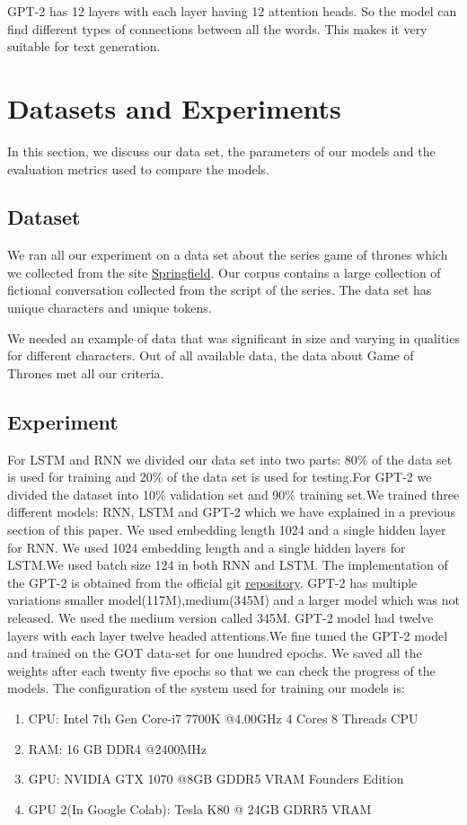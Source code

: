 \documentclass[11pt,a4paper]{article}
\begin{document}
GPT-2 has 12 layers with each layer having 12 attention heads. So the model can find different types of connections between all the words. This makes it very suitable for text generation.
\section{Datasets and Experiments}
In this section, we discuss our data set, the parameters of our models and the evaluation metrics used to compare the models.

\subsection{Dataset}
We ran all our experiment on a data set about the series game of thrones which we collected from the site  \href{https://www.springfieldspringfield.co.uk/view_episode_scripts.php?tv-show=game-of-thrones&episode=s01e01}{Springfield}. Our corpus contains a large collection of fictional conversation collected from the script of the series. The data set has  unique characters and unique tokens.

We needed an example of data that was significant in size and varying in qualities for different characters. Out of all available data, the data about Game of Thrones met all our criteria.

   
\subsection{Experiment}
For LSTM and RNN we divided our data set into two parts: 80\% of the data set is used for training and  20\% of the data set is used for testing.For GPT-2 we divided the dataset into 10\% validation set and 90\% training set.We trained three different models: RNN, LSTM and GPT-2 which we have explained in a previous section of this paper.
We used embedding length 1024 and a single hidden layer for RNN. We used 1024 embedding length and a single hidden layers for LSTM.We used batch size 124 in both RNN and LSTM. The implementation of the GPT-2 is obtained from the official git \href{https://github.com/openai/gpt-2}{repository}. GPT-2 has multiple variations smaller model(117M),medium(345M) and a larger model which was not released. We used the medium version called 345M. GPT-2 model had twelve layers with each layer twelve headed attentions.We fine tuned the GPT-2 model and trained on the GOT data-set for one hundred epochs. We saved all the weights after each twenty five epochs so that we can check the progress of the models. 
The configuration of the system used for training our models is:
\begin{enumerate}
    \item CPU: Intel 7th Gen Core-i7 7700K @4.00GHz 4 Cores 8 Threads CPU
    \item RAM: 16 GB DDR4 @2400MHz 
    \item GPU: NVIDIA GTX 1070 @8GB GDDR5 VRAM Founders Edition
    \item GPU 2(In Google Colab): Tesla K80 @ 24GB GDRR5 VRAM 
    
\end{enumerate}
\end{document}
